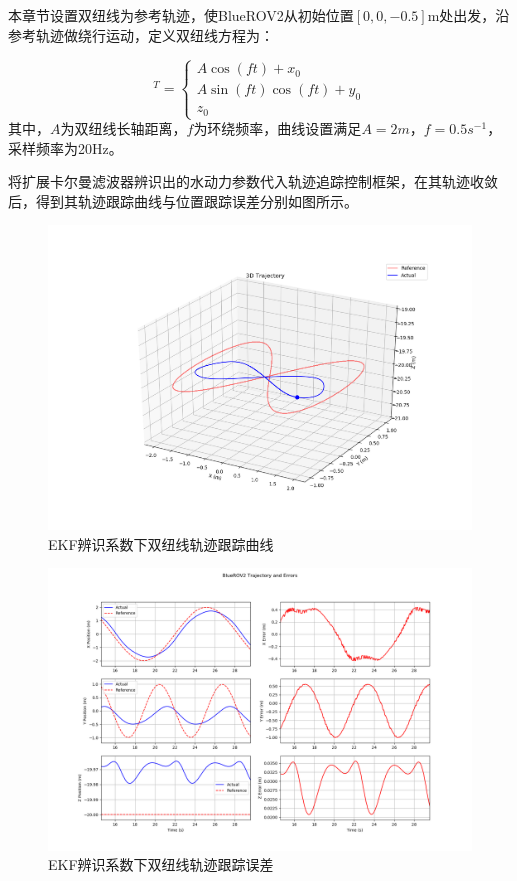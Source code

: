 本章节设置双纽线为参考轨迹，使BlueROV2从初始位置$[0,0,-0.5]\text{m}$处出发，沿参考轨迹做绕行运动，定义双纽线方程为：

\begin{equation}
    [x_r,y_r,z_r]^T=\left\{\begin{matrix}
        A\cos(ft)+x_0 \\
        A\sin(ft)\cos(ft)+y_0 \\
        z_0
    \end{matrix}\right.
\end{equation}
其中，$A$为双纽线长轴距离，$f$为环绕频率，曲线设置满足$A=2m$，$f=0.5s^{-1}$，采样频率为20Hz。

将扩展卡尔曼滤波器辨识出的水动力参数代入轨迹追踪控制框架，在其轨迹收敛后，得到其轨迹跟踪曲线与位置跟踪误差分别如图所示。

\begin{figure}[hbt]
    \centering
    \includegraphics[width=0.8\linewidth]{images/chapter4/lem_traj.png}
    \caption{EKF辨识系数下双纽线轨迹跟踪曲线}
    \label{f.lem_track_traj}
\end{figure}
\begin{figure}[hbt]
    \centering
    \includegraphics[width=0.8\linewidth]{images/chapter4/lem_error.png}
    \caption{EKF辨识系数下双纽线轨迹跟踪误差}
    \label{f.lem_track_error}
\end{figure}

